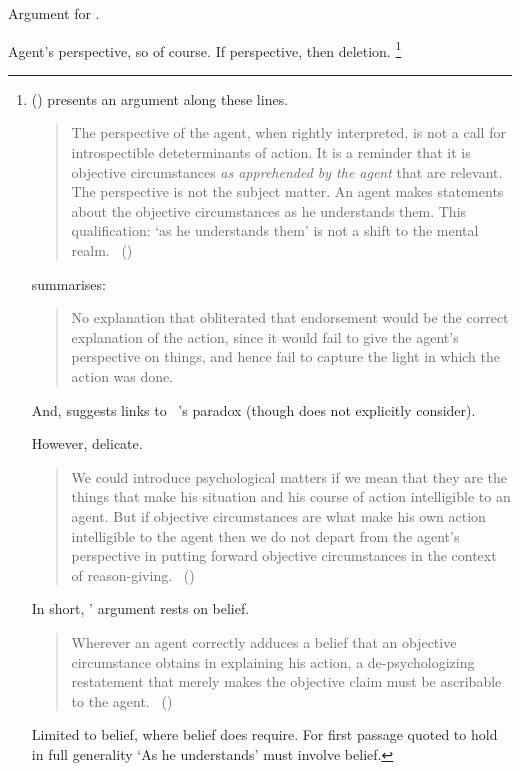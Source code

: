 \begin{note}
  Argument for \ptivity{}.

  Agent's perspective, so of course.
  If perspective, then deletion.%
  \footnote{
    \citeauthor{Collins:1997wn} (\citeyear{Collins:1997wn}) presents an argument along these lines.
    \begin{quote}
    The perspective of the agent, when rightly interpreted, is not a call for introspectible deteterminants of action.
    It is a reminder that it is objective circumstances \emph{as apprehended by the agent} that are relevant.
    The perspective is not the subject matter.
    An agent makes statements about the objective circumstances as he understands them.
    This qualification: `as he understands them' is not a shift to the mental realm.%
    \mbox{ }\hfill\mbox{(\citeyear[120]{Collins:1997wn})}
  \end{quote}

  \citeauthor{Dancy:2000aa} summarises:
  \begin{quote}
    No explanation that obliterated that endorsement would be the correct explanation of the action, since it would fail to give the agent’s perspective on things, and hence fail to capture the light in which the action was done.
    \citeyear[108]{Dancy:2000aa}
  \end{quote}

  And, \citeauthor{Dancy:2000aa} suggests links to ~\citeauthor{Moore:1993wk}'s paradox (though \citeauthor{Collins:1997wn} does not explicitly consider).

  However, delicate.
  \begin{quote}
    We could introduce psychological matters if we mean that they are the things that make his situation and his course of action intelligible to an agent.
    But if objective circumstances are what make his own action intelligible to the agent then we do not depart from the agent’s perspective in putting forward objective circumstances in the context of reason-giving.%
    \mbox{ }\hfill\mbox{(\citeyear[120]{Collins:1997wn})}
  \end{quote}
  In short, \citeauthor{Collins:1997wn}' argument rests on belief.
  \begin{quote}
    Wherever an agent correctly adduces a belief that an objective circumstance obtains in explaining his action, a de-psychologizing restatement that merely makes the objective claim must be ascribable to the agent.%
    \mbox{ }\hfill\mbox{(\citeyear[120]{Collins:1997wn})}
  \end{quote}
  Limited to belief, where belief does require.
  For first passage quoted to hold in full generality `As he understands' must involve belief.

}
\end{note}
